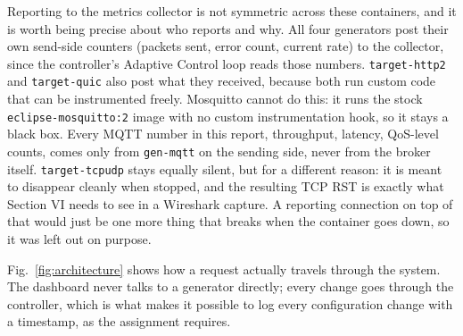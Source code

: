 Reporting to the metrics collector is not symmetric across these
containers, and it is worth being precise about who reports and why. All four
generators post their own send-side counters (packets sent, error count,
current rate) to the collector, since the controller's Adaptive Control loop
reads those numbers. \texttt{target-http2} and \texttt{target-quic} also post
what they received, because both run custom code that can be instrumented
freely. Mosquitto cannot do this: it runs the stock
\texttt{eclipse-mosquitto:2} image with no custom instrumentation hook, so it
stays a black box. Every MQTT number in this report, throughput, latency,
QoS-level counts, comes only from \texttt{gen-mqtt} on the sending side, never
from the broker itself. \texttt{target-tcpudp} stays equally silent, but for
a different reason: it is meant to disappear cleanly when stopped, and the
resulting TCP RST is exactly what Section VI needs to see in a Wireshark
capture. A reporting connection on top of that would just be one more thing
that breaks when the container goes down, so it was left out on purpose.

Fig.~\ref{fig:architecture} shows how a request actually travels through the
system. The dashboard never talks to a generator directly; every change goes
through the controller, which is what makes it possible to log every
configuration change with a timestamp, as the assignment requires.

